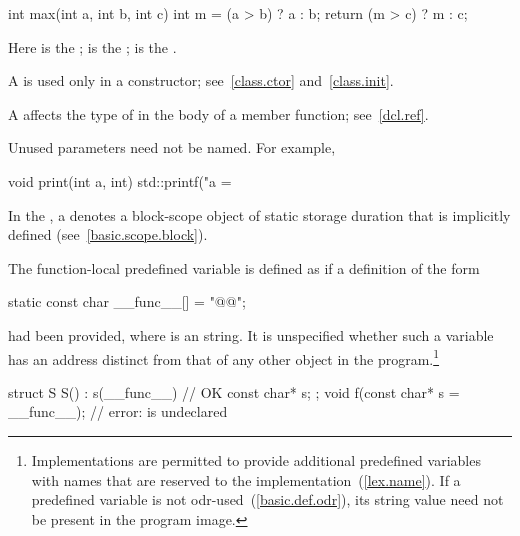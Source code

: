 %
\begin{codeblock}
int max(int a, int b, int c) {
  int m = (a > b) ? a : b;
  return (m > c) ? m : c;
}
\end{codeblock}

Here
is the
;
is the
;
is the
.
\exitexample

\pnum
{}%
%
%
A
is used only in a constructor; see~\ref{class.ctor} and~\ref{class.init}.

\pnum
\enternote
A  affects the type of 
in the body of a member function; see~\ref{dcl.ref}.
\exitnote

\pnum
\enternote
Unused parameters need not be named.
For example,

%
\begin{codeblock}
void print(int a, int) {
  std::printf("a = %
}
\end{codeblock}
\exitnote

\pnum
In the , a
 denotes a block-scope object of static
storage duration that is implicitly defined (see~\ref{basic.scope.block}).

\pnum
The function-local predefined variable  is
defined as if a definition of the form

\begin{codeblock}
static const char __func__[] = "@@";
\end{codeblock}

had been provided, where  is an  string. It is unspecified whether such a variable has an address
distinct from that of any other object in the program.\footnote{Implementations are
permitted to provide additional predefined variables with names that are reserved to the
implementation~(\ref{lex.name}). If a predefined variable is not
odr-used~(\ref{basic.def.odr}), its string value need not be present in the program image.}

\enterexample
\begin{codeblock}
struct S {
  S() : s(__func__) { }             // OK
  const char* s;
};
void f(const char* s = __func__);  // error:  is undeclared
\end{codeblock}
\exitexample

